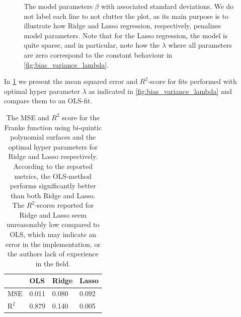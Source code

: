 \documentclass[dvipsnames, article, a4paper, oneside, 12pt]{memoir}
\begin{document}
  \begin{figure}[htpb]
  	\centering
	\caption{The model parameters \( \beta \) with associated standard
	deviations. We do not label each line to not clutter the plot, as its
	main purpose is to illustrate how Ridge and Lasso regression, respectively,
	penalizes model parameters. Note that for the Lasso regression, the model is
	quite sparse, and in particular, note how the \( \lambda \) where all
	parameters are zero correspond to the constant behaviour in
	\cref{fig:bias_variance_lambda}.}%
	\label{fig:ridge_lasso_beta_variance}
  \end{figure}
	
  In \cref{tbl:ridge_lasso_mse_r2} we present the mean squared error and
  \(R^2\)-score for fits performed with optimal hyper parameter \( \lambda \)
  as indicated in \cref{fig:bias_variance_lambda} and compare them to an
  OLS-fit.

  \begin{table}[htpb]
  	\centering
	\caption{The MSE and \( R^2 \) score for the Franke function using
		bi-quintic polynomial surfaces and the optimal hyper parameters
		for Ridge and Lasso respectively. According to the reported
		metrics, the OLS-method performs significantly better than both
		Ridge and Lasso. The \(R^2\)-scores reported for Ridge and
	Lasso seem unreasonably low compared to OLS, which may indicate an
error in the implementation, or the authors lack of experience in the field.}
  	\label{tbl:ridge_lasso_mse_r2}
  	\begin{tabular}{llll}
		\toprule
		{} & OLS & Ridge & Lasso \\
		\midrule
		\( \mathrm{MSE} \) & \num{0.011} & \num{0.080} & \num{0.092} \\
		\( \mathrm{R}^2 \) & \num{0.879} & \num{0.140} & \num{0.005} \\
		\bottomrule
  	\end{tabular}
  \end{table}
\end{document}
